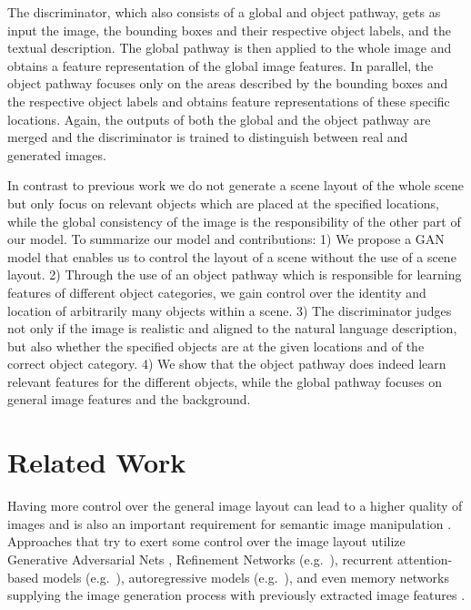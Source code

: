 \documentclass{article} \usepackage{iclr2019_conference,times}
\begin{document}
	The discriminator, which also consists of a global and object pathway, gets as input the image, the bounding boxes and their respective object labels, and the textual description.
	The global pathway is then applied to the whole image and obtains a feature representation of the global image features.
	In parallel, the object pathway focuses only on the areas described by the bounding boxes and the respective object labels and obtains feature representations of these specific locations.
	Again, the outputs of both the global and the object pathway are merged and the discriminator is trained to distinguish between real and generated images.
	
	In contrast to previous work we do not generate a scene layout of the whole scene but only focus on relevant objects which are placed at the specified locations, while the global consistency of the image is the responsibility of the other part of our model.
	To summarize our model and contributions: 1) We propose a GAN model that enables us to control the layout of a scene without the use of a scene layout. 2) Through the use of an object pathway which is responsible for learning features of different object categories, we gain control over the identity and location of arbitrarily many objects within a scene. 3) The discriminator judges not only if the image is realistic and aligned to the natural language description, but also whether the specified objects are at the given locations and of the correct object category. 4) We show that the object pathway does indeed learn relevant features for the different objects, while the global pathway focuses on general image features and the background.
	
	
	\section{Related Work}
	Having more control over the general image layout can lead to a higher quality of images \citep{reed2016learning,hong2018inferring} and is also an important requirement for semantic image manipulation \citep{hong2018learning,wang2018high}.
	Approaches that try to exert some control over the image layout utilize Generative Adversarial Nets \citep{goodfellow2014generative}, Refinement Networks (e.g.\ \cite{chen2017photographic,xu2018deep}), recurrent attention-based models (e.g.\ \cite{mansimov2015generating}), autoregressive models (e.g.\ \cite{reed2016generating}), and even memory networks supplying the image generation process with previously extracted image features \citep{zhang2018text}.
	
\end{document}
